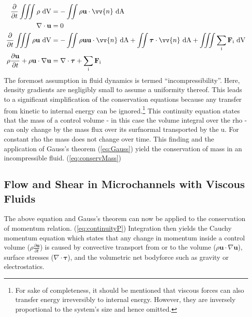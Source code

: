 \begin{align}
	\frac{\partial}{\partial t} \iiint \rho \ \mathrm{dV} &= - \iint \rho \mathbf{u} \cdot \vv{n} \ \mathrm{dA} \label{eq:continuityM}\\
	\nabla \cdot \mathbf{u} &= 0 \label{eq:conservMass}\\	
	\frac{\partial}{\partial t} \iiint \rho\mathbf{u} \ \mathrm{dV} &= - \iint \rho \mathbf{u}\mathbf{u} \cdot \vv{n} \ \mathrm{dA} + \iint \boldsymbol{\tau} \cdot \vv{n} \ \mathrm{dA}  + \iiint  \sum_\text{i}\mathbf{F}_\text{i} \ \mathrm{dV} \label{eq:continuityP} \\	
		\rho \frac{\partial \mathbf{u}}{\partial t} + \rho\mathbf{u} \cdot \nabla \mathbf{u} &= \nabla \cdot \boldsymbol{\tau} + \sum_\text{i}\mathbf{F}_\text{i} \label{eq:cauchymomentum} \\			
\end{align}
The foremost assumption in fluid dynamics is termed ``incompressibility''. Here, density gradients are negligibly small to assume a uniformity thereof. This leads to a significant simplification of the conservation equations because any transfer from kinetic to internal energy can be ignored.\footnote{For sake of completeness, it should be mentioned that viscous forces can also transfer energy irreversibly to internal energy. However, they are inversely proportional to the system's size and hence omitted.}
This continuity equation states that the mass of a control volume - in this case the volume integral over the \gls{rho} - can only change by the mass flux over its \gls{surfnormal} transported by the \gls{u}. For constant \gls{rho} the mass does not change over time. This finding and the application of Gauss's theorem (\cref{eq:Gauss}) yield the conservation of mass in an incompressible fluid. (\cref{eq:conservMass})


\subsection{Flow and Shear in Microchannels with Viscous Fluids}
\label{sec:theo:flow_and_Shear}

The above equation and Gauss's theorem can now be applied to the conservation of momentum relation. (\cref{eq:continuityP}) Integration then yields the Cauchy momentum equation which states that any change in momentum inside a control volume ($\rho \frac{\partial \mathbf{u}}{\partial t}$) is caused by convective transport from or to the volume ($\rho\mathbf{u} \cdot \nabla \mathbf{u}$), surface stresses ($ \nabla \cdot \boldsymbol{\tau}$), and the volumetric net \gls{bodyforce} such as gravity or electrostatics.

